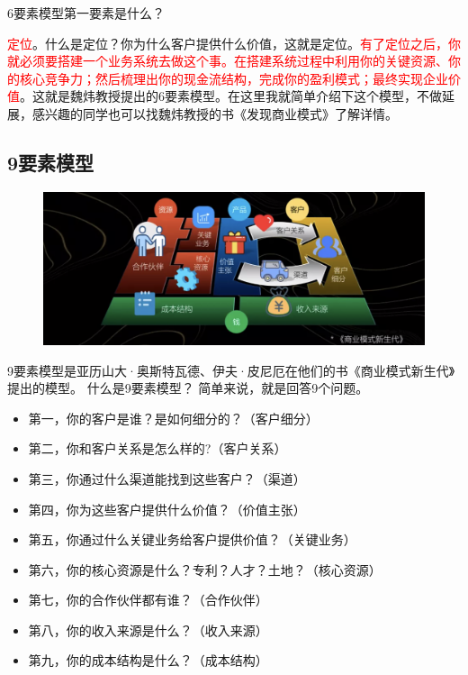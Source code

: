 \documentclass[12pt]{article}
\begin{document}
6要素模型第一要素是什么？

\textcolor{red}{定位}。什么是定位？你为什么客户提供什么价值，这就是定位。\textcolor{red}{有了定位之后，你就必须要搭建一个业务系统去做这个事。在搭建系统过程中利用你的关键资源、你的核心竞争力；然后梳理出你的现金流结构，完成你的盈利模式；最终实现企业价值}。这就是魏炜教授提出的6要素模型。在这里我就简单介绍下这个模型，不做延展，感兴趣的同学也可以找魏炜教授的书《发现商业模式》了解详情。

\subsection{9要素模型}
\begin{figure}[H]
    \centering
    \includegraphics[width=1\textwidth]{fig/BusinessModel_5.png}
\end{figure}

9要素模型是亚历山大·奥斯特瓦德、伊夫·皮尼厄在他们的书《商业模式新生代》提出的模型。 什么是9要素模型？ 简单来说，就是回答9个问题。 
\begin{itemize}
\setlength{\itemsep}{0pt}
\setlength{\parsep}{0pt}
\setlength{\parskip}{0pt}
    \item 第一，你的客户是谁？是如何细分的？（客户细分） 
    \item 第二，你和客户关系是怎么样的?（客户关系）  
    \item 第三，你通过什么渠道能找到这些客户？（渠道）   
    \item 第四，你为这些客户提供什么价值？（价值主张） 
    \item 第五，你通过什么关键业务给客户提供价值？（关键业务） 
    \item 第六，你的核心资源是什么？专利？人才？土地？（核心资源）   
    \item 第七，你的合作伙伴都有谁？（合作伙伴）    
    \item 第八，你的收入来源是什么？（收入来源） 
    \item 第九，你的成本结构是什么？（成本结构）  
\end{itemize}
\end{document}
